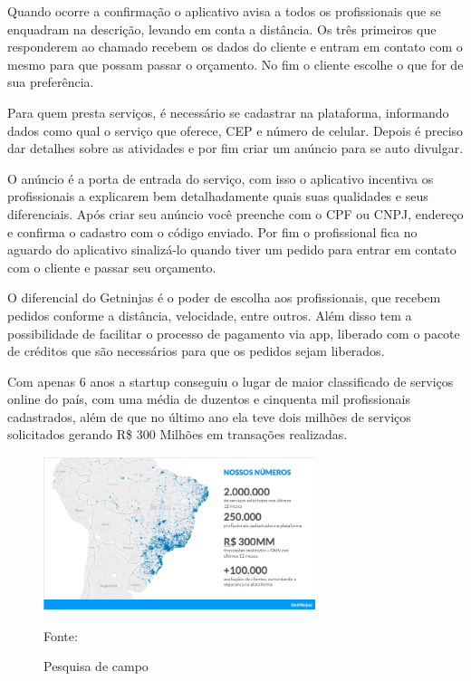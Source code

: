 Quando ocorre a confirmação o aplicativo avisa a todos os profissionais que se enquadram na descrição, levando em conta a distância. Os três primeiros que responderem ao chamado recebem os dados do cliente e entram em contato com o mesmo para que possam passar o orçamento. No fim o cliente escolhe o que for de sua preferência.

Para quem presta serviços, é necessário se cadastrar na plataforma, informando dados como qual o serviço que oferece, CEP e número de celular. Depois é preciso dar detalhes sobre as atividades e por fim criar um anúncio para se auto divulgar.

O anúncio é a porta de entrada do serviço, com isso o aplicativo incentiva os profissionais a explicarem bem detalhadamente quais suas qualidades e seus diferenciais. Após criar seu anúncio você preenche com o CPF ou CNPJ, endereço e confirma o cadastro com o código enviado. Por fim o profissional fica no aguardo do aplicativo sinalizá-lo quando tiver um pedido para entrar em contato com o cliente e passar seu orçamento.

O diferencial do Getninjas é o poder de escolha aos profissionais, que recebem pedidos conforme a distância, velocidade, entre outros. Além disso tem a possibilidade de facilitar o processo de pagamento via app, liberado com o pacote de créditos que são necessários para que os pedidos sejam liberados.

Com apenas 6 anos a startup conseguiu o lugar de maior classificado de serviços online do país, com uma média de duzentos e cinquenta mil profissionais cadastrados, além de que no último ano ela teve dois milhões de serviços solicitados gerando R\$ 300 Milhões em transações realizadas.

\begin{figure}[!h]
	\centering
	\caption{Pesquisa de campo}
	\includegraphics[width=300px, height=170px]{./images/getNinjasMobile.png}
	\par {Fonte: \cite{get-ninjasMobile}}
\end{figure}
\newpage


